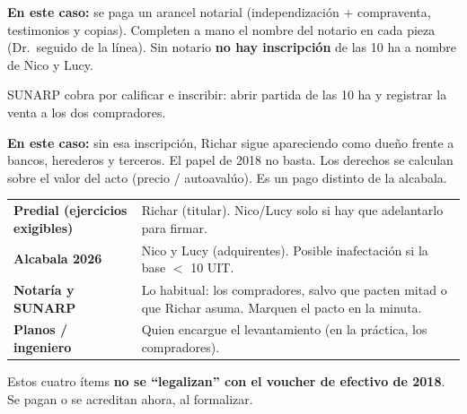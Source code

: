 \documentclass[12pt,a4paper]{article}
\begin{document}
\textbf{En este caso:} se paga un arancel notarial (independización + compraventa, testimonios y copias). Completen a mano el nombre del notario en cada pieza (Dr.\ seguido de la línea). Sin notario \textbf{no hay inscripción} de las 10 ha a nombre de Nico y Lucy.

SUNARP cobra por calificar e inscribir: abrir partida de las 10 ha y registrar la venta a los dos compradores.

\textbf{En este caso:} sin esa inscripción, Richar sigue apareciendo como dueño frente a bancos, herederos y terceros. El papel de 2018 no basta. Los derechos se calculan sobre el valor del acto (precio / autoavalúo). Es un pago distinto de la alcabala.

{\small\renewcommand{\arraystretch}{1.25}
\noindent\begin{tabularx}{\linewidth}{@{}>{\bfseries}p{4.2cm}>{\raggedright\arraybackslash}X@{}}
Predial (ejercicios exigibles) & Richar (titular). Nico/Lucy solo si hay que adelantarlo para firmar. \\
Alcabala 2026 & Nico y Lucy (adquirentes). Posible inafectación si la base $<$ 10 UIT. \\
Notaría y SUNARP & Lo habitual: los compradores, salvo que pacten mitad o que Richar asuma. Marquen el pacto en la minuta. \\
Planos / ingeniero & Quien encargue el levantamiento (en la práctica, los compradores). \\
\end{tabularx}}

\vspace{0.35em}
\noindent Estos cuatro ítems \textbf{no se ``legalizan'' con el voucher de efectivo de 2018}. Se pagan o se acreditan ahora, al formalizar.

\LugarFecha
\FirmasCompradores
\vspace{0.4em}
\noindent
{}
\end{document}
